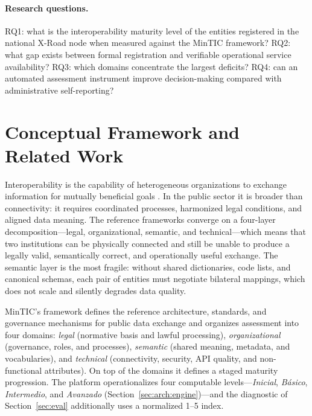 \documentclass[runningheads]{llncs}
\begin{document}
\paragraph{Research questions.} RQ1: what is the interoperability maturity
level of the entities registered in the national X-Road node when measured
against the MinTIC framework? RQ2: what gap exists between formal
registration and verifiable operational service availability? RQ3: which
domains concentrate the largest deficits? RQ4: can an automated assessment
instrument improve decision-making compared with administrative
self-reporting?

\section{Conceptual Framework and Related Work}
\label{sec:related}

\begin{sloppypar}
Interoperability is the capability of heterogeneous organizations to
exchange information for mutually beneficial goals \cite{eif2017}. In the
public sector it is broader than connectivity: it requires coordinated
processes, harmonized legal conditions, and aligned data meaning. The
reference frameworks converge on a four-layer decomposition---legal,
organizational, semantic, and technical---which means that two institutions
can be physically connected and still be unable to produce a legally valid,
semantically correct, and operationally useful exchange. The semantic layer
is the most fragile: without shared dictionaries, code lists, and canonical
schemas, each pair of entities must negotiate bilateral mappings, which does
not scale and silently degrades data quality.
\end{sloppypar}

\begin{sloppypar}
MinTIC's framework defines the reference architecture, standards, and
governance mechanisms for public data exchange \cite{mintic2025} and
organizes assessment into four domains: \emph{legal} (normative basis and
lawful processing), \emph{organizational} (governance, roles, and
processes), \emph{semantic} (shared meaning, metadata, and vocabularies),
and \emph{technical} (connectivity, security, API quality, and non-functional
attributes). On top of the domains it defines a staged maturity progression.
The platform operationalizes four computable levels---\emph{Inicial},
\emph{B\'asico}, \emph{Intermedio}, and \emph{Avanzado}
(Section~\ref{sec:arch:engine})---and the diagnostic of
Section~\ref{sec:eval} additionally uses a normalized 1--5 index.
\end{sloppypar}
\end{document}
